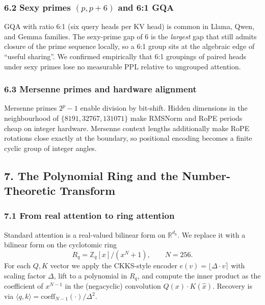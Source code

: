 \documentclass[
  11pt,
]{article}
\begin{document}
\hypertarget{sexy-primes-p-p6-and-61-gqa}{%
\subsubsection{\texorpdfstring{6.2 Sexy primes \((p, p+6)\) and 6:1
GQA}{6.2 Sexy primes (p, p+6) and 6:1 GQA}}\label{sexy-primes-p-p6-and-61-gqa}}

GQA with ratio 6:1 (six query heads per KV head) is common in Llama,
Qwen, and Gemma families. The sexy-prime gap of 6 is the \emph{largest}
gap that still admits closure of the prime sequence locally, so a 6:1
group sits at the algebraic edge of ``useful sharing''. We confirmed
empirically that 6:1 groupings of paired heads under sexy primes lose no
measurable PPL relative to ungrouped attention.

\hypertarget{mersenne-primes-and-hardware-alignment}{%
\subsubsection{6.3 Mersenne primes and hardware
alignment}\label{mersenne-primes-and-hardware-alignment}}

Mersenne primes \(2^p - 1\) enable division by bit-shift. Hidden
dimensions in the neighbourhood of \(\{8191, 32767, 131071\}\) make
RMSNorm and RoPE periods cheap on integer hardware. Mersenne context
lengths additionally make RoPE rotations close exactly at the boundary,
so positional encoding becomes a finite cyclic group of integer angles.

\hypertarget{the-polynomial-ring-and-the-number-theoretic-transform}{%
\subsection{7. The Polynomial Ring and the Number-Theoretic
Transform}\label{the-polynomial-ring-and-the-number-theoretic-transform}}

\hypertarget{from-real-attention-to-ring-attention}{%
\subsubsection{7.1 From real attention to ring
attention}\label{from-real-attention-to-ring-attention}}

Standard attention is a real-valued bilinear form on
\(\mathbb{R}^{d_k}\). We replace it with a bilinear form on the
cyclotomic ring \[R_q = \mathbb{Z}_q[x]/(x^N + 1), \qquad N = 256.\] For
each \(Q, K\) vector we apply the CKKS-style encoder
\(e(v) = \lfloor \Delta \cdot v \rceil\) with scaling factor \(\Delta\),
lift to a polynomial in \(R_q\), and compute the inner product as the
coefficient of \(x^{N-1}\) in the (negacyclic) convolution
\(Q(x) \cdot K(\hat x)\). Recovery is via
\(\langle q, k\rangle = \mathrm{coeff}_{N-1}(\cdot) / \Delta^2\).
\end{document}
